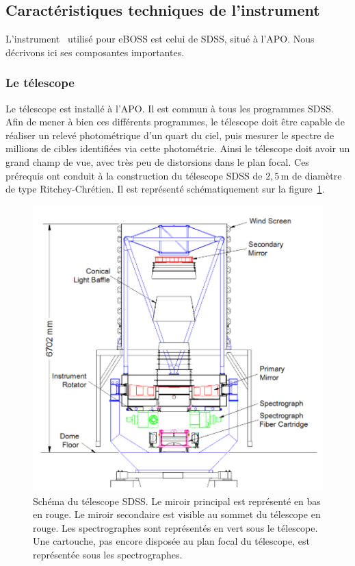 \documentclass[11pt, twoside, a4paper, openright]{report}
\begin{document}
\subsection{Caractéristiques techniques de l'instrument}
L'instrument~\cite{Gunn2006} utilisé pour eBOSS est celui de SDSS, situé à l'APO. Nous décrivons ici ses composantes importantes.

\subsubsection{Le télescope}
Le télescope est installé à l'APO. Il est commun à tous les programmes SDSS. Afin de mener à bien ces différents programmes, le télescope doit être capable de réaliser un relevé photométrique d'un quart du ciel, puis mesurer le spectre de millions de cibles identifiées via cette photométrie. Ainsi le télescope doit avoir un grand champ de vue, avec très peu de distorsions dans le plan focal. Ces prérequis ont conduit à la construction du télescope SDSS de $2,5\,\mathrm{m}$ de diamètre de type Ritchey-Chrétien. Il est représenté schématiquement sur la figure~\ref{fig:SchemaTelescope}. \\
\begin{figure}
  \centering
  \includegraphics[scale=0.5]{../img/eBOSS/SchemaTelescope}
  \caption{Schéma du télescope SDSS. Le miroir principal est représenté en bas en rouge. Le miroir secondaire est visible au sommet du télescope en rouge. Les spectrographes sont représentés en vert sous le télescope. Une cartouche, pas encore disposée au plan focal du télescope, est représentée sous les spectrographes.}
  \label{fig:SchemaTelescope}
\end{figure}
\end{document}
